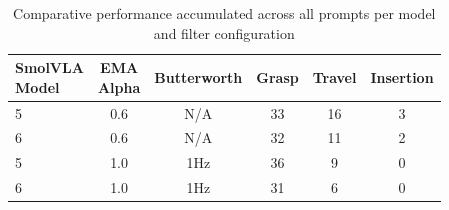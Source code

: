 \documentclass[conference]{IEEEtran}
\begin{document}

\begin{table}[H]
    \centering
    \small
    \begin{tabular}{@{}lccccc@{}}
        \toprule
        \makecell[c]{\textbf{SmolVLA}\\\textbf{Model}} & \makecell[c]{\textbf{EMA}\\\textbf{Alpha}} & \textbf{Butterworth} & \textbf{Grasp} & \textbf{Travel} & \textbf{Insertion} \\
        \midrule
        {5} & {0.6} & {N/A} & {33} & {16} & {3} \\
        {6} & {0.6} & {N/A} & {32} & {11} & {2} \\
        {5} & {1.0} & {1Hz} & {36} & {9} & {0} \\
        {6} & {1.0} & {1Hz} & {31} & {6} & {0} \\
        \bottomrule
    \end{tabular}
    \caption{Comparative performance accumulated across all prompts per model and filter configuration}
    \label{tab:franka_results_models_accumulated}
\end{table}
\end{document}
